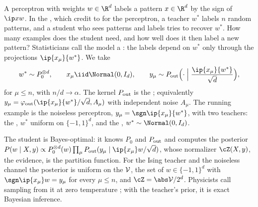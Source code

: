 \begin{refsection}
A perceptron with weights $w\in\R^d$ labels a pattern $x\in\R^d$ by the sign of $\ip xw$. In the , which \textcite{BarbierEtAl2019} credit to \textcite{GardnerDerrida1989b} for the perceptron, a teacher $w^*$ labels $n$ random patterns, and a student who sees patterns and labels tries to recover $w^*$. How many examples does the student need, and how well does it then label a new pattern? Statisticians call the model a : the labels depend on $w^*$ only through the projections $\ip{x_\mu}{w^*}$. We take
\begin{equation}\label{eq:glm:model}
w^*\sim P_0^{\otimes d},\qquad x_\mu\iid\Normal(0,I_d),\qquad y_\mu\sim\glmPout\Bigl(\cdot\Bigm|\frac{\ip{x_\mu}{w^*}}{\sqrt d}\Bigr),
\end{equation}
for $\mu\le n$, with $n/d\to\alpha$. The kernel $P_{\mathrm{out}}$ is the ; equivalently $y_\mu=\varphi_{\mathrm{out}}(\ip{x_\mu}{w^*}/\sqrt d,A_\mu)$ with independent noise $A_\mu$. The running example is the noiseless perceptron, $y_\mu=\sgn\ip{x_\mu}{w^*}$, with two teachers: the , $w^*$ uniform on $\{-1,1\}^d$, and the , $w^*\sim\Normal(0,I_d)$.

The student is Bayes-optimal: it knows $P_0$ and $P_{\mathrm{out}}$ and computes the posterior $P(w\mid X,y)\propto P_0^{\otimes d}(w)\prod_\mu\glmPout(y_\mu\mid\ip{x_\mu}w/\sqrt d)$, whose normalizer $\cZ(X,y)$, the evidence, is the partition function. For the Ising teacher and the noiseless channel the posterior is uniform on the  $\mathcal{V}$, the set of $w\in\{-1,1\}^d$ with $\sgn\ip{x_\mu}w=y_\mu$ for every $\mu\le n$, and $\cZ=\abs\glmV/2^d$. Physicists call sampling from it  at zero temperature \parencite{SeungSompolinskyTishby1992}; with the teacher's prior, it is exact Bayesian inference.


\end{refsection}
